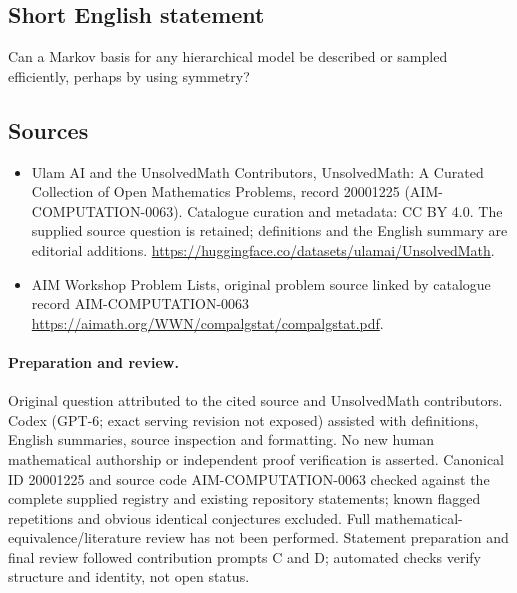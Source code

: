 \documentclass[11pt]{article}
\begin{document}
\subsection{Short English statement}
Can a Markov basis for any hierarchical model be described or sampled efficiently, perhaps by using symmetry?
\subsection{Sources}
\begin{itemize}
\item[\hypertarget{source:20001225:1}{S1}] Ulam AI and the UnsolvedMath Contributors, UnsolvedMath: A Curated Collection of Open Mathematics Problems, record 20001225 (AIM-COMPUTATION-0063). Catalogue curation and metadata: CC BY 4.0. The supplied source question is retained; definitions and the English summary are editorial additions.
\url{https://huggingface.co/datasets/ulamai/UnsolvedMath}.
\item[\hypertarget{source:20001225:2}{S2}] AIM Workshop Problem Lists, original problem source linked by catalogue record AIM-COMPUTATION-0063
\url{https://aimath.org/WWN/compalgstat/compalgstat.pdf}.
\end{itemize}
\paragraph{Preparation and review.}
Original question attributed to the cited source and UnsolvedMath contributors. Codex (GPT-6; exact serving revision not exposed) assisted with definitions, English summaries, source inspection and formatting. No new human mathematical authorship or independent proof verification is asserted. Canonical ID 20001225 and source code AIM-COMPUTATION-0063 checked against the complete supplied registry and existing repository statements; known flagged repetitions and obvious identical conjectures excluded. Full mathematical-equivalence/literature review has not been performed. Statement preparation and final review followed contribution prompts C and D; automated checks verify structure and identity, not open status.
\label{end:20001225}
\end{document}
